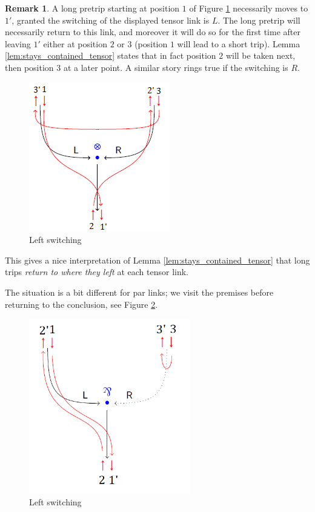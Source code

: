 \documentclass[12pt]{article}
\theoremstyle{plain}
\theoremstyle{definition}
\newtheorem{remark}[thm]{Remark}
\begin{document}
	\begin{remark}
		A long pretrip starting at position $1$ of Figure \ref{fig:stays_contained_explained_tens} necessarily moves to $1'$, granted the switching of the displayed tensor link is $L$. The long pretrip will necessarily return to this link, and moreover it will do so for the first time after leaving $1'$ either at position $2$ or $3$ (position $1$ will lead to a short trip). Lemma \ref{lem:stays_contained_tensor} states that in fact position $2$ will be taken next, then position $3$ at a later point. A similar story rings true if the switching is $R$.
		\begin{figure}[h]
			\centering
			\includegraphics{TensorLeftSwitching.png}
			\caption{Left switching}
			\label{fig:stays_contained_explained_tens}
		\end{figure}
		This gives a nice interpretation of Lemma \ref{lem:stays_contained_tensor} that long trips \emph{return to where they left} at each tensor link.
		
		The situation is a bit different for par links; we visit the premises before returning to the conclusion, see Figure \ref{fig:stays_contained_explained_par}.
		\begin{figure}[h]
			\centering
			\includegraphics[width = 7cm]{ParLeftSwitching.png}
			\caption{Left switching}
			\label{fig:stays_contained_explained_par}
		\end{figure}
	\end{remark}
\end{document}
